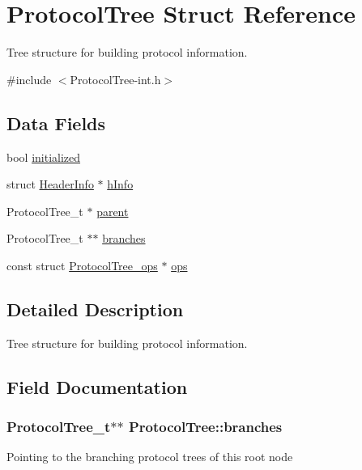 \hypertarget{struct_protocol_tree}{}\section{Protocol\+Tree Struct Reference}
\label{struct_protocol_tree}


Tree structure for building protocol information.  




{\ttfamily \#include $<$Protocol\+Tree-\/int.\+h$>$}

\subsection*{Data Fields}
\begin{DoxyCompactItemize}
\item 
bool \hyperlink{struct_protocol_tree_a6d4f209acc4331cbb440df967d7a4054}{initialized}
\item 
struct \hyperlink{struct_header_info}{Header\+Info} $\ast$ \hyperlink{struct_protocol_tree_a8fce6fc18afa7ddd1fa4f8895064d1ba}{h\+Info}
\item 
Protocol\+Tree\+\_\+t $\ast$ \hyperlink{struct_protocol_tree_a4d7aa1ac9fb932c4a4a7ebc140066ab1}{parent}
\item 
Protocol\+Tree\+\_\+t $\ast$$\ast$ \hyperlink{struct_protocol_tree_aab7be83543870f7313efbec39b72385f}{branches}
\item 
const struct \hyperlink{struct_protocol_tree__ops}{Protocol\+Tree\+\_\+ops} $\ast$ \hyperlink{struct_protocol_tree_aad4c24f365eae4e59887dc5753a0d891}{ops}
\end{DoxyCompactItemize}


\subsection{Detailed Description}
Tree structure for building protocol information. 

\subsection{Field Documentation}
\hypertarget{struct_protocol_tree_aab7be83543870f7313efbec39b72385f}{}
\subsubsection[{branches}]{\setlength{\rightskip}{0pt plus 5cm}Protocol\+Tree\+\_\+t$\ast$$\ast$ Protocol\+Tree\+::branches}\label{struct_protocol_tree_aab7be83543870f7313efbec39b72385f}
Pointing to the branching protocol trees of this root node \hypertarget{struct_protocol_tree_a8fce6fc18afa7ddd1fa4f8895064d1ba}{}
